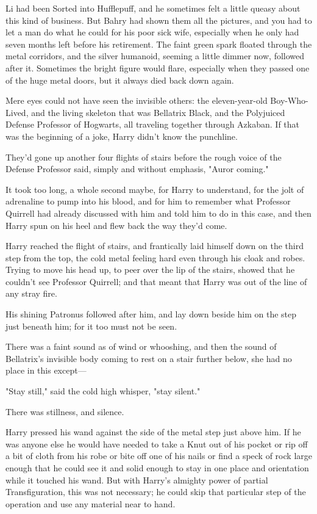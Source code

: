 Li had been Sorted into Hufflepuff, and he sometimes felt a little queasy about
this kind of business. But Bahry had shown them all the pictures, and you had
to let a man do what he could for his poor sick wife, especially when he only
had seven months left before his retirement.
\sbreak
The faint green spark floated through the metal corridors, and the silver
humanoid, seeming a little dimmer now, followed after it. Sometimes the bright
figure would flare, especially when they passed one of the huge metal doors,
but it always died back down again.

Mere eyes could not have seen the invisible others: the eleven-year-old
Boy-Who-Lived, and the living skeleton that was Bellatrix Black, and the
Polyjuiced Defense Professor of Hogwarts, all traveling together through
Azkaban. If that was the beginning of a joke, Harry didn't know the punchline.

They'd gone up another four flights of stairs before the rough voice of the
Defense Professor said, simply and without emphasis, "Auror coming."

It took too long, a whole second maybe, for Harry to understand, for the jolt
of adrenaline to pump into his blood, and for him to remember what Professor
Quirrell had already discussed with him and told him to do in this case, and
then Harry spun on his heel and flew back the way they'd come.

Harry reached the flight of stairs, and frantically laid himself down on the
third step from the top, the cold metal feeling hard even through his cloak and
robes. Trying to move his head up, to peer over the lip of the stairs, showed
that he couldn't see Professor Quirrell; and that meant that Harry was out of
the line of any stray fire.

His shining Patronus followed after him, and lay down beside him on the step
just beneath him; for it too must not be seen.

There was a faint sound as of wind or whooshing, and then the sound of
Bellatrix's invisible body coming to rest on a stair further below, she had no
place in this except---

"Stay still," said the cold high whisper, "stay silent."

There was stillness, and silence.

Harry pressed his wand against the side of the metal step just above him. If he
was anyone else he would have needed to take a Knut out of his pocket{\el}
or rip off a bit of cloth from his robe{\el} or bite off one of his
nails{\el} or find a speck of rock large enough that he could see it and
solid enough to stay in one place and orientation while it touched his wand.
But with Harry's almighty power of partial Transfiguration, this was not
necessary; he could skip that particular step of the operation and use any
material near to hand.

